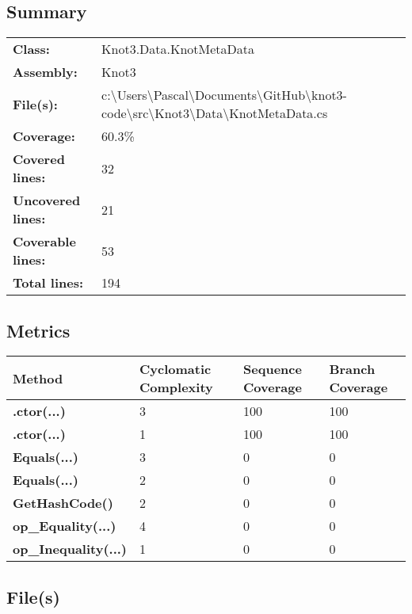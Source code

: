 \documentclass[a4paper,10pt]{article}
\begin{document}
\subsection{Summary}
\begin{longtable}[l]{ll}
\textbf{Class:} & Knot3.Data.KnotMetaData\\
\textbf{Assembly:} & Knot3\\
\textbf{File(s):} & \begin{minipage}[t]{12cm}{c:\textbackslash Users\textbackslash Pascal\textbackslash Documents\textbackslash GitHub\textbackslash knot3-code\textbackslash src\textbackslash Knot3\textbackslash Data\textbackslash KnotMetaData.cs}\end{minipage} \\
\textbf{Coverage:} & 60.3\%\\
\textbf{Covered lines:} & 32\\
\textbf{Uncovered lines:} & 21\\
\textbf{Coverable lines:} & 53\\
\textbf{Total lines:} & 194\\
\end{longtable}
\subsection{Metrics}
\begin{longtable}[l]{|l|l|l|l|}
\hline
\textbf{Method} & \textbf{Cyclomatic Complexity} & \textbf{Sequence Coverage} & \textbf{Branch Coverage}\\
\hline
\textbf{.ctor(...)} & 3 & 100 & 100\\
\hline
\textbf{.ctor(...)} & 1 & 100 & 100\\
\hline
\textbf{Equals(...)} & 3 & 0 & 0\\
\hline
\textbf{Equals(...)} & 2 & 0 & 0\\
\hline
\textbf{GetHashCode()} & 2 & 0 & 0\\
\hline
\textbf{op\_Equality(...)} & 4 & 0 & 0\\
\hline
\textbf{op\_Inequality(...)} & 1 & 0 & 0\\
\hline
\end{longtable}
\subsection{File(s)}
\end{document}
